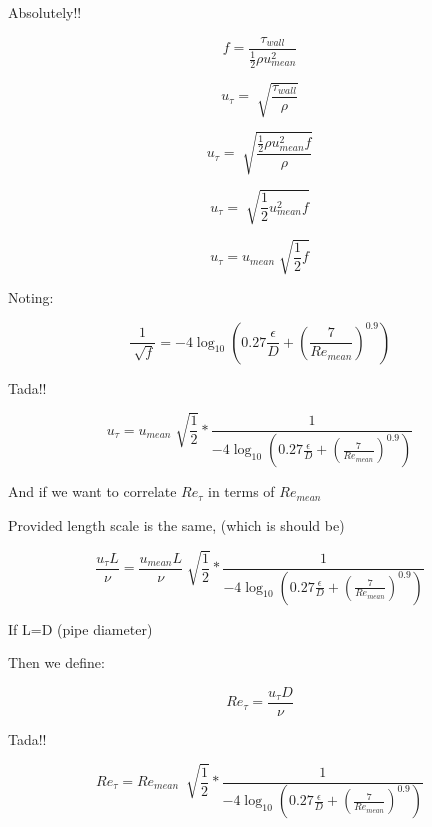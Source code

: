 \documentclass[12pt]{article}
\renewcommand{\_}{\kern-1.5pt\textunderscore\kern-1.5pt}
\begin{document}
Absolutely!!\par

 \[ f=\frac{ \tau_{wall}}{\frac{1}{2} \rho u_{mean}^{2}} \] \par

 \[ u_{ \tau}=\sqrt[]{\frac{ \tau_{wall}}{ \rho }} \] \par

 \[ u_{ \tau}=\sqrt[]{\frac{\frac{1}{2} \rho u_{mean}^{2}f}{ \rho }} \] \par

 \[ u_{ \tau}=\sqrt[]{\frac{1}{2}u_{mean}^{2}f} \] \par

 \[ u_{ \tau}=u_{mean}\sqrt[]{\frac{1}{2}f} \] \par

Noting:\par

 \[ \frac{1}{\sqrt[]{f}}=-4\log _{10} \left( 0.27\frac{ \epsilon }{D}+ \left( \frac{7}{Re_{mean}} \right) ^{0.9} \right)  \] \par

Tada!!\par


\vspace{\baselineskip}
 \[ u_{ \tau}=u_{mean}\sqrt[]{\frac{1}{2}}\ast\frac{1}{-4\log _{10} \left( 0.27\frac{ \epsilon }{D}+ \left( \frac{7}{Re_{mean}} \right) ^{0.9} \right) } \] \par


\vspace{\baselineskip}
And if we want to correlate  \( Re_{ \tau} \)  in terms of  \( Re_{mean} \) \par

Provided length scale is the same, (which is should be)\par

 \[ \frac{u_{ \tau}L}{ \nu }=\frac{u_{mean}L}{ \nu }\sqrt[]{\frac{1}{2}}\ast\frac{1}{-4\log _{10} \left( 0.27\frac{ \epsilon }{D}+ \left( \frac{7}{Re_{mean}} \right) ^{0.9} \right) } \] \par

If L=D (pipe diameter)\par

Then we define: \par

 \[ Re_{ \tau}=\frac{u_{ \tau}D}{ \nu } \] \par

Tada!!\par

 \[ Re_{ \tau}=Re_{mean}~\sqrt[]{\frac{1}{2}}\ast\frac{1}{-4\log _{10} \left( 0.27\frac{ \epsilon }{D}+ \left( \frac{7}{Re_{mean}} \right) ^{0.9} \right) } \] \par
\end{document}
